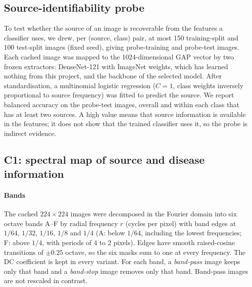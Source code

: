 \subsection{Source-identifiability probe}
\label{sec:probe}
To test whether the source of an image is recoverable from the features a classifier uses, we drew, per (source, class) pair, at most 150 training-split and 100 test-split images (fixed seed), giving \RProbeNTrain{} probe-training and \RProbeNTest{} probe-test images. Each cached image was mapped to the 1024-dimensional GAP vector by two frozen extractors: DenseNet-121 with ImageNet weights, which has learned nothing from this project, and the backbone of the selected model. After standardisation, a multinomial logistic regression ($C=1$, class weights inversely proportional to source frequency) was fitted to predict the source. We report balanced accuracy on the probe-test images, overall and within each class that has at least two sources. A high value means that source information is available in the features; it does not show that the trained classifier uses it, so the probe is indirect evidence.

\subsection{C1: spectral map of source and disease information}
\label{sec:meth-c1}
\paragraph{Bands} The cached $224\times224$ images were decomposed in the Fourier domain into six octave bands A--F by radial frequency $r$ (cycles per pixel) with band edges at $1/64$, $1/32$, $1/16$, $1/8$ and $1/4$ (A: below $1/64$, including the lowest frequencies; F: above $1/4$, with periods of 4 to 2 pixels). Edges have smooth raised-cosine transitions of $\pm0.25$ octave, so the six masks sum to one at every frequency. The DC coefficient is kept in every variant. For each band, a \emph{band-pass} image keeps only that band and a \emph{band-stop} image removes only that band. Band-pass images are not rescaled in contrast.

